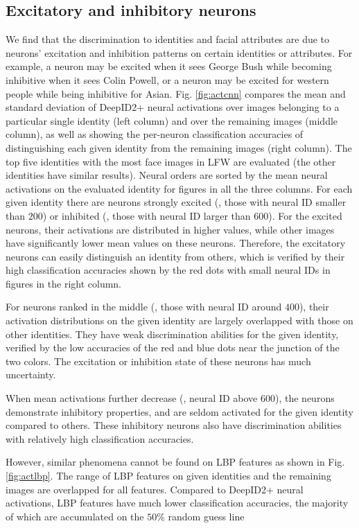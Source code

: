 \documentclass[10pt,twocolumn,letterpaper]{article}
\begin{document}
\subsection{Excitatory and inhibitory neurons}
We find that the discrimination to identities and facial attributes are due to neurons' excitation and inhibition patterns on certain identities or attributes. For example, a neuron may be excited when it sees George Bush while becoming inhibitive when it sees Colin Powell, or a neuron may be excited for western people while being inhibitive for Asian. Fig. \ref{fig:actcnn} compares the mean and standard deviation of DeepID2+ neural activations over images belonging to a particular single identity (left column) and over the remaining images (middle column), as well as showing the per-neuron classification accuracies of distinguishing each given identity from the remaining images (right column). The top five identities with the most face images in LFW are evaluated (the other identities have similar results). Neural orders are sorted by the mean neural activations on the evaluated identity for figures in all the three columns. For each given identity there are neurons strongly excited (\eg, those with neural ID smaller than $200$) or inhibited (\eg, those with neural ID larger than $600$). For the excited neurons, their activations are distributed in higher values, while  other images have significantly lower mean values on these neurons. Therefore, the excitatory neurons can easily distinguish an identity from others, which is verified by their high classification accuracies shown by the red dots with small neural IDs in figures in the right column.

For neurons ranked in the middle (\eg, those with neural ID around $400$), their activation distributions on the given identity are largely overlapped with those on other identities. They have weak discrimination abilities for the given identity, verified by the low accuracies of the red and blue dots near the junction of the two colors. The excitation or inhibition state of these neurons has much uncertainty.

When mean activations further decrease (\eg, neural ID above $600$), the neurons demonstrate inhibitory properties, and are seldom activated for the given identity compared to others. These inhibitory neurons also have discrimination abilities with relatively high classification accuracies.

However, similar phenomena cannot be found on LBP features as shown in Fig. \ref{fig:actlbp}. The range of LBP features on given identities and the remaining images are overlapped for all features. Compared to DeepID2+ neural activations, LBP features have much lower classification accuracies, the majority of which are accumulated on the $50\%$ random guess line
\end{document}
